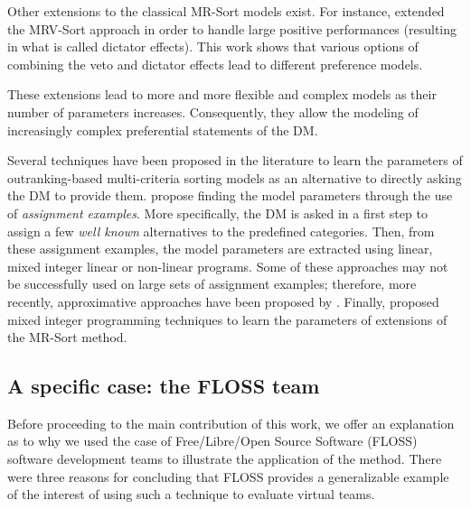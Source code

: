 Other extensions to the classical MR-Sort models exist. For instance, \cite{Meyer2017216} extended the MRV-Sort approach in order to handle large positive performances (resulting in what is called dictator effects). This work shows that various options of combining the veto and dictator effects lead to different preference models. 

These extensions lead to more and more flexible and complex models as their number of parameters increases. Consequently, they allow the modeling of increasingly complex preferential statements of the DM. 

Several techniques have been proposed in the literature to learn the parameters of outranking-based multi-criteria sorting models as an alternative to directly asking the DM to provide them. \cite{mousseauusing2001,mousseauinferringelectre1998,theusing2002} propose finding the model parameters through the use of {\em assignment examples}. More specifically, the DM is asked in a first step to  assign a few {\em well known} alternatives to the predefined categories. Then, from these assignment examples, the model parameters are extracted using linear, mixed integer linear or non-linear programs. Some of these approaches may not be successfully used on large sets of assignment examples; therefore, more recently, approximative approaches have been proposed by \cite{olteanumeyer2014,sobriemousseaupirlot2013}. Finally, \cite{Meyer2017216} proposed mixed integer programming techniques to learn the parameters of extensions of the MR-Sort method. 



\subsection{A specific case: the FLOSS team}

Before proceeding to the main contribution of this work, we offer an explanation as to why we used the case of Free/Libre/Open Source Software (FLOSS) software development teams to illustrate the application of the method. There were three reasons for concluding that FLOSS provides a generalizable example of the interest of using such a technique to evaluate virtual teams.


